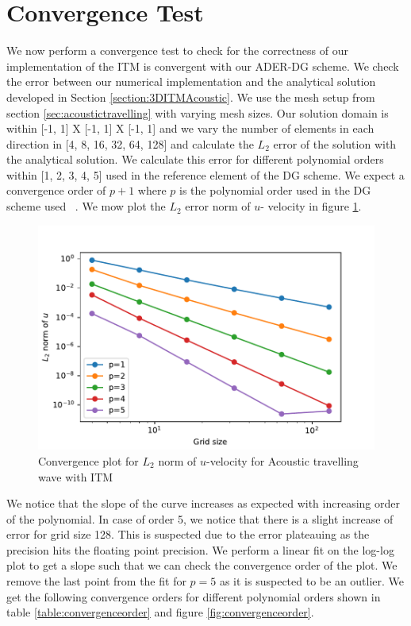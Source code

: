 \section{Convergence Test}
We now perform a convergence test to check for the correctness of our implementation of the \ac{ITM} is convergent with our \ac{ADER}-\ac{DG} scheme. 
We check the error between our numerical implementation and the analytical solution developed in Section \ref{section:3DITMAcoustic}. We use the mesh setup
from section \ref{sec:acoustictravelling} with varying mesh sizes. Our solution domain is within [-1, 1] X [-1, 1] X [-1, 1] and we vary the number of elements
in each direction in [4, 8, 16, 32, 64, 128] and calculate the $L_2$ error of the solution with the analytical solution. We calculate this error for different polynomial
orders within [1, 2, 3, 4, 5] used in the reference element of the \ac{DG} scheme. We expect a convergence order of $p+1$ where $p$ is the polynomial order used in the
\ac{DG} scheme used ~\parencite{cockburn2011discontinuous}. We mow plot the $L_2$ error norm of $u$- velocity in figure \ref{fig:convergence}.

\begin{figure}
    \centering
    \includegraphics[width=0.75\linewidth]{figures/error1.pdf}
    \caption{Convergence plot for $L_2$ norm of $u$-velocity for Acoustic travelling wave with \ac{ITM}}
    \label{fig:convergence}
\end{figure}

We notice that the slope of the curve increases as expected with increasing order of the polynomial. In case of order 5, we notice that there is a slight increase
of error for grid size 128. This is suspected due to the error plateauing as the precision hits the floating point precision. We perform a linear fit on the log-log
plot to get a slope such that we can check the convergence order of the plot. We remove the last point from the fit for $p=5$ as it is suspected to be an outlier. 
We get the following convergence orders for different polynomial orders shown in table \ref{table:convergenceorder} and figure \ref{fig:convergenceorder}.

